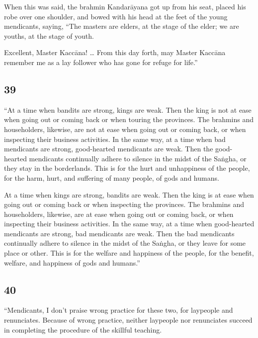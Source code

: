 \documentclass[12pt,openany]{book}%
\begin{document}
When this was said, the brahmin \textsanskrit{Kandarāyana} got up from his seat, placed his robe over one shoulder, and bowed with his head at the feet of the young mendicants, saying, “The masters are elders, at the stage of the elder; we are youths, at the stage of youth. 

Excellent, Master \textsanskrit{Kaccāna}! … From this day forth, may Master \textsanskrit{Kaccāna} remember me as a lay follower who has gone for refuge for life.” 

\subsection*{39 }

“At a time when bandits are strong, kings are weak. Then the king is not at ease when going out or coming back or when touring the provinces. The brahmins and householders, likewise, are not at ease when going out or coming back, or when inspecting their business activities. In the same way, at a time when bad mendicants are strong, good-hearted mendicants are weak. Then the good-hearted mendicants continually adhere to silence in the midst of the \textsanskrit{Saṅgha}, or they stay in the borderlands. This is for the hurt and unhappiness of the people, for the harm, hurt, and suffering of many people, of gods and humans. 

At a time when kings are strong, bandits are weak. Then the king is at ease when going out or coming back or when inspecting the provinces. The brahmins and householders, likewise, are at ease when going out or coming back, or when inspecting their business activities. In the same way, at a time when good-hearted mendicants are strong, bad mendicants are weak. Then the bad mendicants continually adhere to silence in the midst of the \textsanskrit{Saṅgha}, or they leave for some place or other. This is for the welfare and happiness of the people, for the benefit, welfare, and happiness of gods and humans.” 

\subsection*{40 }

“Mendicants, I don’t praise wrong practice for these two, for laypeople and renunciates. Because of wrong practice, neither laypeople nor renunciates succeed in completing the procedure of the skillful teaching. 
\end{document}
